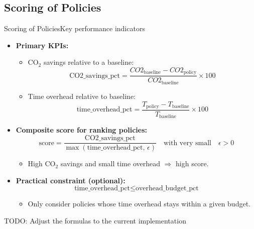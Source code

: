 \subsection{Scoring of Policies}

\begin{frame}[t]{Scoring of Policies}{Key performance indicators}

  \begin{itemize}
    \item \textbf{Primary KPIs:}
      \begin{itemize}
        \item CO$_2$ savings relative to a baseline:
          \[
            \text{CO2\_savings\_pct}
            = \frac{CO2_{\text{baseline}} -
            CO2_{\text{policy}}}{CO2_{\text{baseline}}} \times 100
          \]
        \item Time overhead relative to baseline:
          \[
            \text{time\_overhead\_pct}
            = \frac{T_{\text{policy}} -
            T_{\text{baseline}}}{T_{\text{baseline}}} \times 100
          \]
      \end{itemize}

      \vspace{0.2cm}
    \item \textbf{Composite score for ranking policies:}
      \[
        \text{score} =
        \frac{\text{CO2\_savings\_pct}}
        {\max(\text{time\_overhead\_pct}, \,\epsilon)}
        \quad\text{with very small}\quad \epsilon > 0
      \]
      \begin{itemize}
        \item High CO$_2$ savings and small time overhead
          $\Rightarrow$ high score.
      \end{itemize}

      \vspace{0.2cm}
    \item \textbf{Practical constraint (optional):}
      \[
        \text{time\_overhead\_pct} \leq \text{overhead\_budget\_pct}
      \]
      \begin{itemize}
        \item Only consider policies whose time overhead stays within
          a given budget.
      \end{itemize}
  \end{itemize}

  TODO: Adjust the formulas to the current implementation

\end{frame}
